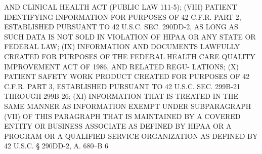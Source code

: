  AND CLINICAL HEALTH ACT (PUBLIC LAW 111-5);
   (VIII)  PATIENT IDENTIFYING INFORMATION FOR PURPOSES OF 42 C.F.R. PART
 2, ESTABLISHED PURSUANT TO 42 U.S.C. SEC. 290DD-2, AS LONG AS SUCH  DATA
 IS NOT SOLD IN VIOLATION OF HIPAA OR ANY STATE OR FEDERAL LAW;
   (IX)  INFORMATION  AND  DOCUMENTS LAWFULLY CREATED FOR PURPOSES OF THE
 FEDERAL HEALTH CARE QUALITY IMPROVEMENT ACT OF 1986, AND  RELATED  REGU-
 LATIONS;
   (X) PATIENT SAFETY WORK PRODUCT CREATED FOR PURPOSES OF 42 C.F.R. PART
 3, ESTABLISHED PURSUANT TO 42 U.S.C. SEC. 299B-21 THROUGH 299B-26;
   (XI)  INFORMATION  THAT  IS  TREATED IN THE SAME MANNER AS INFORMATION
 EXEMPT UNDER SUBPARAGRAPH (VII) OF THIS PARAGRAPH THAT IS MAINTAINED  BY
 A  COVERED ENTITY OR BUSINESS ASSOCIATE AS DEFINED BY HIPAA OR A PROGRAM
 OR A QUALIFIED SERVICE ORGANIZATION AS DEFINED BY 42 U.S.C.  §  290DD-2,
 A. 680--B                           6
 

